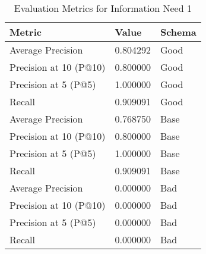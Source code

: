 \begingroup
    \renewcommand{\arraystretch}{2} %
    \begin{table}[]
        \centering
        \begin{tabular}{l | l | l}
            Metric & Value & Schema \\
            \hline
            Average Precision & 0.804292 & Good\\
            Precision at 10 (P@10) & 0.800000 & Good\\
            Precision at 5 (P@5) & 1.000000 & Good\\
            Recall & 0.909091 & Good\\
            \hline
            Average Precision & 0.768750 & Base\\
            Precision at 10 (P@10) & 0.800000 & Base\\
            Precision at 5 (P@5) & 1.000000 & Base\\
            Recall & 0.909091 & Base\\
            \hline
            Average Precision & 0.000000 & Bad \\
            Precision at 10 (P@10) & 0.000000 & Bad \\
            Precision at 5 (P@5) & 0.000000 & Bad \\
            Recall & 0.000000 & Bad \\
        \end{tabular}
        \caption{Evaluation Metrics for Information Need 1}
        \label{tab:metrics-info-1}
    \end{table}
\endgroup